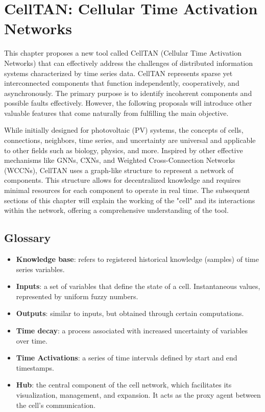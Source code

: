 \chapter{CellTAN: Cellular Time Activation Networks} \label{chap:chap4}

This chapter proposes a new tool called CellTAN (Cellular Time Activation Networks) that can effectively address the challenges of distributed information systems characterized by time series data. CellTAN represents sparse yet interconnected components that function independently, cooperatively, and asynchronously. The primary purpose is to identify incoherent components and possible faults effectively. However, the following proposals will introduce other valuable features that come naturally from fulfilling the main objective. 

While initially designed for photovoltaic (PV) systems, the concepts of cells, connections, neighbors, time series, and uncertainty are universal and applicable to other fields such as biology, physics, and more.
Inspired by other effective mechanisms like GNNs, CXNs, and Weighted Cross-Connection Networks (WCCNs), CellTAN uses a graph-like structure to represent a network of components. This structure allows for decentralized knowledge and requires minimal resources for each component to operate in real time.
The subsequent sections of this chapter will explain the working of the "cell" and its interactions within the network, offering a comprehensive understanding of the tool.

\section{Glossary}

\begin{itemize}
    \item \textbf{Knowledge base}: refers to registered historical knowledge (samples) of time series variables.
    
    \item \textbf{Inputs}: a set of variables that define the state of a cell. Instantaneous values, represented by uniform fuzzy numbers.

    \item \textbf{Outputs}: similar to inputs, but obtained through certain computations.

    \item \textbf{Time decay}: a process associated with increased uncertainty of variables over time.
    
    \item \textbf{Time Activations}: a series of time intervals defined by start and end timestamps.

    \item \textbf{Hub}: the central component of the cell network, which facilitates its visualization, management, and expansion. It acts as the proxy agent between the cell's communication.
    
\end{itemize}


